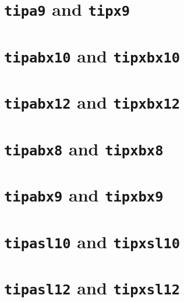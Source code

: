 \sampletext{\footnotesize\rmtipa\rmfamily\tipaencoding}

\section{\texttt{tipa9} and \texttt{tipx9}}

\sampletext{\small\rmtipa\rmfamily\tipaencoding}

\section{\texttt{tipabx10} and \texttt{tipxbx10}}

\sampletext{\bfseries\rmtipa\rmfamily\tipaencoding}

\section{\texttt{tipabx12} and \texttt{tipxbx12}}

\sampletext{\large\bfseries\rmtipa\rmfamily\tipaencoding}

\section{\texttt{tipabx8} and \texttt{tipxbx8}}

\sampletext{\footnotesize\bfseries\rmtipa\rmfamily\tipaencoding}

\section{\texttt{tipabx9} and \texttt{tipxbx9}}

\sampletext{\small\bfseries\rmtipa\rmfamily\tipaencoding}

\section{\texttt{tipasl10} and \texttt{tipxsl10}}

\sampletext{\slshape\rmtipa\rmfamily\tipaencoding}

\section{\texttt{tipasl12} and \texttt{tipxsl12}}

